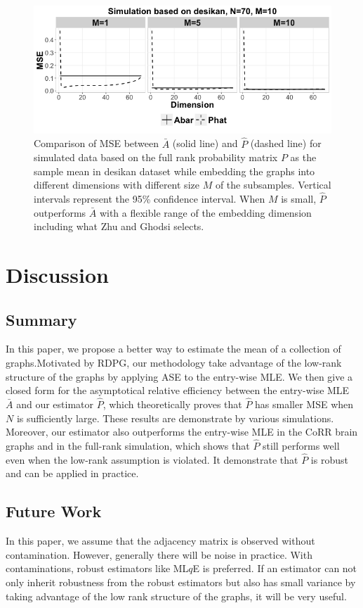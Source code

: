 \documentclass[a4paper]{article}
\begin{document}
\begin{figure}[!htb]
\centering
\includegraphics[width=1\textwidth]{sim_desikan.png}
\caption{Comparison of MSE between $\bar{A}$ (solid line) and $\hat{P}$ (dashed line) for simulated data based on the full rank probability matrix $P$ as the sample mean in desikan dataset while embedding the graphs into different dimensions with different size $M$ of the subsamples. Vertical intervals represent the 95\% confidence interval. When $M$ is small, $\hat{P}$ outperforms $\bar{A}$ with a flexible range of the embedding dimension including what Zhu and Ghodsi selects.}
\label{fig:sim_desikan}
\end{figure}



\section{Discussion}

\subsection{Summary}
In this paper, we propose a better way to estimate the mean of a collection of graphs.Motivated by RDPG, our methodology take advantage of the low-rank structure of the graphs by applying ASE to the entry-wise MLE. We then give a closed form for the asymptotical relative efficiency between the entry-wise MLE $\bar{A}$ and our estimator $\hat{P}$, which theoretically proves that $\hat{P}$ has smaller MSE when $N$ is sufficiently large. These results are demonstrate by various simulations. Moreover, our estimator also outperforms the entry-wise MLE in the CoRR brain graphs and in the full-rank simulation, which shows that $\hat{P}$ still performs well even when the low-rank assumption is violated. It demonstrate that $\hat{P}$ is robust and can be applied in practice.


\subsection{Future Work}
In this paper, we assume that the adjacency matrix is observed without contamination. However, generally there will be noise in practice. With contaminations, robust estimators like ML$q$E is preferred. If an estimator can not only inherit robustness from the robust estimators but also has small variance by taking advantage of the low rank structure of the graphs, it will be very useful.
\end{document}
